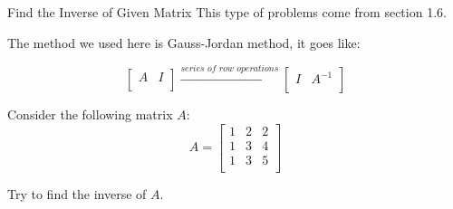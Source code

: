 \documentclass{beamer}
\begin{document}
\begin{frame}{Find the Inverse of Given Matrix}
This type of problems come from section 1.6.

\vspace{3pt}
The method we used here is Gauss-Jordan method, it goes like:

\begin{equation*}
    \left[ \begin{matrix}
        A&		I\\
    \end{matrix} \right] \xrightarrow{series\,\,of\,\,row\,\,operations}\left[ \begin{matrix}
        I&		A^{-1}\\
    \end{matrix} \right]
\end{equation*}

Consider the following matrix $A$:
\begin{equation*}
    A=\left[ \begin{matrix}
        1&		2&		2\\
        1&		3&		4\\
        1&		3&		5\\
    \end{matrix} \right]
\end{equation*}

Try to find the inverse of $A$.

\end{frame}
\end{document}
